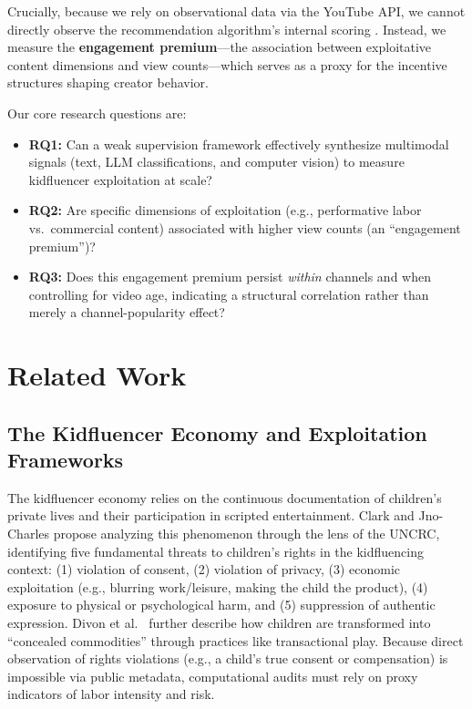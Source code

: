 \documentclass[letterpaper]{article} %
\begin{document}
Crucially, because we rely on observational data via the YouTube API, we cannot directly observe the recommendation algorithm's internal scoring \citep{bouchaud2024auditing,rieder2018ranking}. Instead, we measure the \textbf{engagement premium}---the association between exploitative content dimensions and view counts---which serves as a proxy for the incentive structures shaping creator behavior.

Our core research questions are:
\begin{itemize}
    \item \textbf{RQ1:} Can a weak supervision framework effectively synthesize multimodal signals (text, LLM classifications, and computer vision) to measure kidfluencer exploitation at scale?
    \item \textbf{RQ2:} Are specific dimensions of exploitation (e.g., performative labor vs.\ commercial content) associated with higher view counts (an ``engagement premium'')?
    \item \textbf{RQ3:} Does this engagement premium persist \emph{within} channels and when controlling for video age, indicating a structural correlation rather than merely a channel-popularity effect?
\end{itemize}

\section{Related Work}

\subsection{The Kidfluencer Economy and Exploitation Frameworks}

The kidfluencer economy relies on the continuous documentation of children's private lives and their participation in scripted entertainment. Clark and Jno-Charles \citep{clark2025child} propose analyzing this phenomenon through the lens of the UNCRC, identifying five fundamental threats to children's rights in the kidfluencing context: (1) violation of consent, (2) violation of privacy, (3) economic exploitation (e.g., blurring work/leisure, making the child the product), (4) exposure to physical or psychological harm, and (5) suppression of authentic expression. Divon et al.\ \citep{divon2025children} further describe how children are transformed into ``concealed commodities'' through practices like transactional play. Because direct observation of rights violations (e.g., a child's true consent or compensation) is impossible via public metadata, computational audits must rely on proxy indicators of labor intensity and risk.
\end{document}

